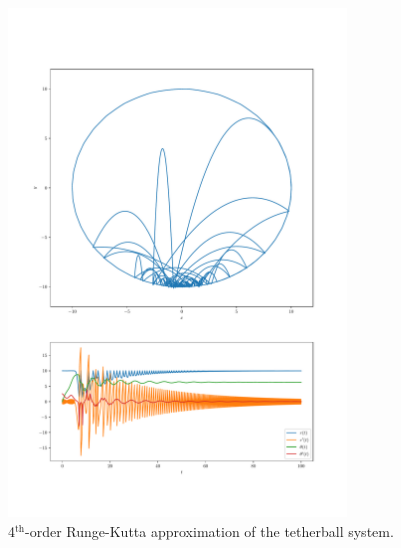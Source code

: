 \documentclass{article}
\newcommand{\0}{\vb{0}}
\begin{document}
\begin{figure}
  \begin{center}
  \includegraphics[width=0.8\textwidth]{fig.pdf}
  \end{center}
  \caption{\label{fig:f1} 4$^\mathrm{th}$-order Runge-Kutta approximation of the tetherball system.}
\end{figure}
\end{document}
